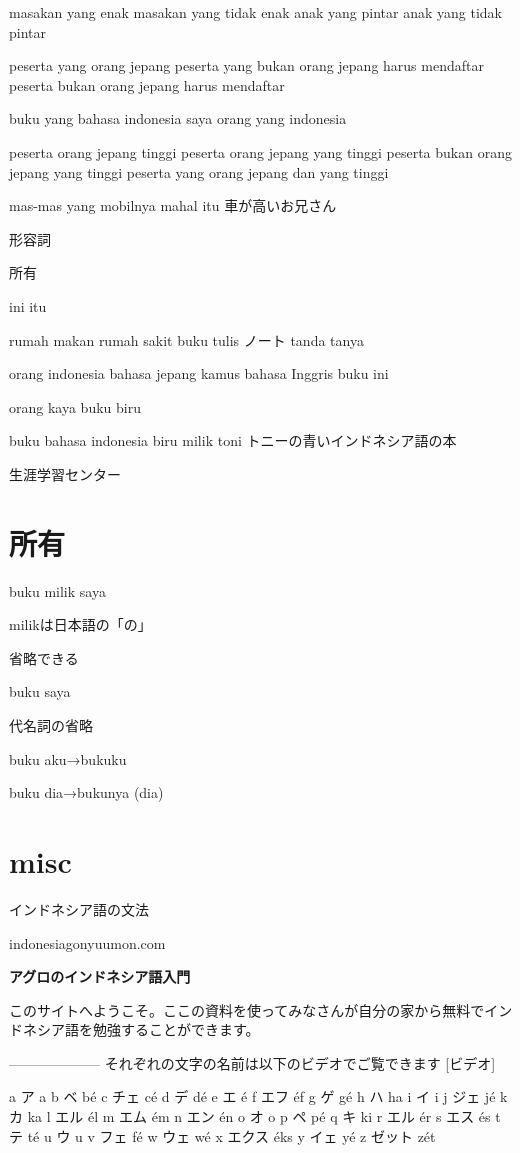 \documentclass[uplatex]{jsarticle}
\begin{document}
masakan yang enak
masakan yang tidak enak
anak yang pintar
anak yang tidak pintar

peserta yang orang jepang
peserta yang bukan orang jepang harus mendaftar
peserta bukan orang jepang harus mendaftar

buku yang bahasa indonesia
saya orang yang indonesia

peserta orang jepang tinggi
peserta orang jepang yang tinggi
peserta bukan orang jepang yang tinggi
peserta yang orang jepang dan yang tinggi

mas-mas yang mobilnya mahal itu
車が高いお兄さん

形容詞



所有

ini
itu

rumah makan
rumah sakit
buku tulis ノート
tanda tanya

orang indonesia
bahasa jepang
kamus bahasa Inggris
buku ini

orang kaya
buku biru

buku bahasa indonesia biru milik toni
トニーの青いインドネシア語の本

生涯学習センター

\section{所有}

buku milik saya

milikは日本語の「の」

省略できる

buku saya

代名詞の省略

buku aku→bukuku

buku dia→bukunya (dia)

\section{misc}

インドネシア語の文法

indonesiagonyuumon.com

\textbf{アグロのインドネシア語入門}


このサイトへようこそ。ここの資料を使ってみなさんが自分の家から無料でインドネシア語を勉強することができます。

--------------------
それぞれの文字の名前は以下のビデオでご覧できます
[ビデオ]

a ア a
b ベ bé
c チェ cé
d デ dé
e エ é
f エフ éf
g ゲ gé
h ハ ha
i イ i
j ジェ jé
k カ ka
l エル él
m エム ém
n エン én
o オ o
p ペ pé
q キ ki
r エル ér
s エス és
t テ té
u ウ u
v フェ fé
w ウェ wé
x エクス éks
y イェ yé
z ゼット zét
\end{document}
